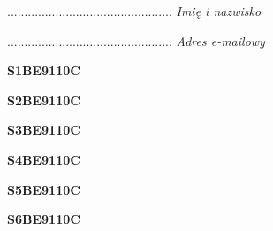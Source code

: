 \begin{turn}{90}\begin{minipage}{\linewidth} \vspace{20mm} ................................................  \textit{Imię i nazwisko}\end{minipage}\end{turn}

\begin{turn}{90}\begin{minipage}{\linewidth} \vspace{20mm} ................................................  \textit{Adres e-mailowy}\end{minipage}\end{turn}

\begin{turn}{90}\huge \begin{minipage}{\linewidth} \vspace{10mm}\textbf{S1BE9110C}\end{minipage}\end{turn}

\begin{turn}{90}\huge \begin{minipage}{\linewidth} \vspace{10mm}\textbf{S2BE9110C}\end{minipage}\end{turn}

\begin{turn}{90}\huge \begin{minipage}{\linewidth} \vspace{10mm}\textbf{S3BE9110C}\end{minipage}\end{turn}

\begin{turn}{90}\huge \begin{minipage}{\linewidth} \vspace{10mm}\textbf{S4BE9110C}\end{minipage}\end{turn}

\begin{turn}{90}\huge \begin{minipage}{\linewidth} \vspace{10mm}\textbf{S5BE9110C}\end{minipage}\end{turn}

\begin{turn}{90}\huge \begin{minipage}{\linewidth} \vspace{10mm}\textbf{S6BE9110C}\end{minipage}\end{turn}

